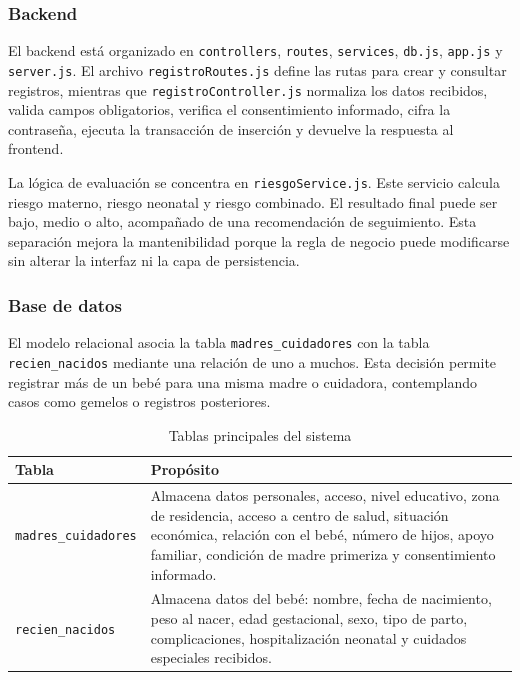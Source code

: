\documentclass[12pt,letterpaper]{article}
\begin{document}
\subsubsection{Backend}

El backend está organizado en \texttt{controllers}, \texttt{routes}, \texttt{services}, \texttt{db.js}, \texttt{app.js} y \texttt{server.js}. El archivo \texttt{registroRoutes.js} define las rutas para crear y consultar registros, mientras que \texttt{registroController.js} normaliza los datos recibidos, valida campos obligatorios, verifica el consentimiento informado, cifra la contraseña, ejecuta la transacción de inserción y devuelve la respuesta al frontend.

La lógica de evaluación se concentra en \texttt{riesgoService.js}. Este servicio calcula riesgo materno, riesgo neonatal y riesgo combinado. El resultado final puede ser bajo, medio o alto, acompañado de una recomendación de seguimiento. Esta separación mejora la mantenibilidad porque la regla de negocio puede modificarse sin alterar la interfaz ni la capa de persistencia.

\subsubsection{Base de datos}

El modelo relacional asocia la tabla \texttt{madres\_cuidadores} con la tabla \texttt{recien\_nacidos} mediante una relación de uno a muchos. Esta decisión permite registrar más de un bebé para una misma madre o cuidadora, contemplando casos como gemelos o registros posteriores.

\begin{longtable}{p{}p{}}
\caption{Tablas principales del sistema}\\
\toprule
\textbf{Tabla} & \textbf{Propósito}\\
\midrule
\texttt{madres\_cuidadores} & Almacena datos personales, acceso, nivel educativo, zona de residencia, acceso a centro de salud, situación económica, relación con el bebé, número de hijos, apoyo familiar, condición de madre primeriza y consentimiento informado.\\
\texttt{recien\_nacidos} & Almacena datos del bebé: nombre, fecha de nacimiento, peso al nacer, edad gestacional, sexo, tipo de parto, complicaciones, hospitalización neonatal y cuidados especiales recibidos.\\
\bottomrule
\end{longtable}
\end{document}
